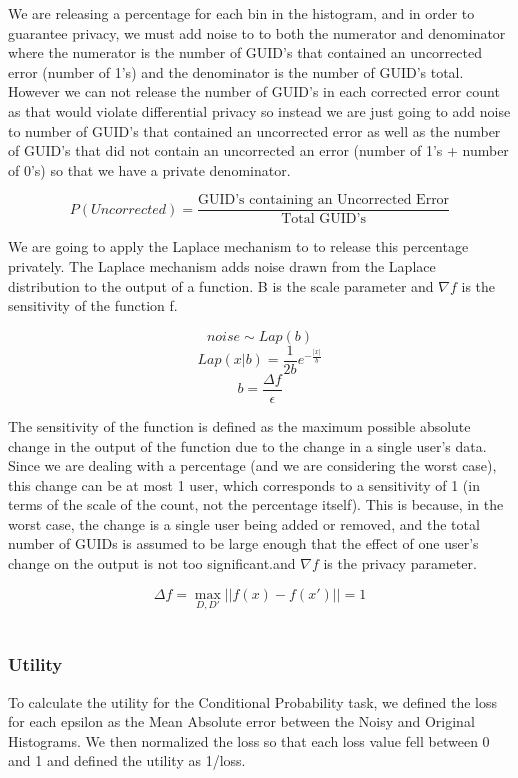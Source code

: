 \documentclass[12pt,letterpaper]{article}
\begin{document}
We are releasing a percentage for each bin in the histogram, and in order to guarantee privacy, we must add noise to to both the numerator and denominator where the numerator is the number of GUID's that contained an uncorrected error (number of 1's) and the denominator is the number of GUID's total. However we can not release the number of GUID's in each corrected error count as that would violate differential privacy so instead we are just going to add noise to number of GUID's that contained an uncorrected error as well as the number of GUID's that did not contain an uncorrected an error (number of 1's + number of 0's) so that we have a private denominator. 

\[
P(Uncorrected) = \frac{\text{GUID's containing an Uncorrected Error}}{\text{Total GUID's}}
\]

We are going to apply the Laplace mechanism to to release this percentage privately. The Laplace mechanism adds noise drawn from the Laplace distribution to the output of a function. B is the scale parameter and $\nabla f$ is the sensitivity of the function f. \cite{DworkRoth}


$$noise \sim Lap(b) $$
$$Lap(x|b) = \frac{1}{2b}e^{-\frac{|x|}{b}}$$
$$b = \frac{\Delta f}{\epsilon}$$

The sensitivity of the function is defined as the maximum possible absolute change in the output of the function due to the change in a single user's data. Since we are dealing with a percentage (and we are considering the worst case), this change can be at most 1 user, which corresponds to a sensitivity of 1 (in terms of the scale of the count, not the percentage itself). This is because, in the worst case, the change is a single user being added or removed, and the total number of GUIDs is assumed to be large enough that the effect of one user's change on the output is not too significant.and $\nabla f$ is the privacy parameter. 
\begin{center}
$$\Delta f = \max_{D, D'} ||f(x) - f(x')|| = 1$$ \\
\end{center}

\subsubsection{Utility}

To calculate the utility for the Conditional Probability task, we defined the loss for each epsilon as the Mean Absolute error between the Noisy and Original Histograms. We then normalized the loss so that each loss value fell between 0 and 1 and defined the utility as 1/loss. 
\end{document}
